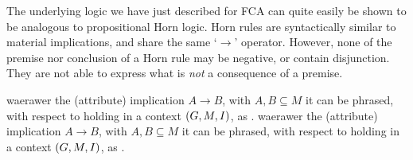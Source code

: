 The underlying logic we have just described for FCA can quite easily be shown to be analogous to propositional Horn logic. Horn rules are syntactically similar to material implications, and share the same
`$\rightarrow$' operator. However, none of the premise nor conclusion of a Horn rule may be negative, or contain disjunction. They are not able to express what is \textit{not} a consequence of a
premise.

waerawer the (attribute) implication $A \rightarrow B$, with $A, B \subseteq M$ it can be phrased, with respect to holding in a context $(G,M,\mathrel{I})$, as .
waerawer the (attribute) implication $A \rightarrow B$, with $A, B \subseteq M$ it can be phrased, with respect to holding in a context $(G,M,\mathrel{I})$, as .





